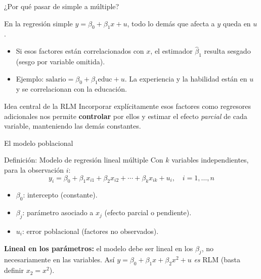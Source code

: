 \documentclass{beamer}
\begin{document}
\begin{frame}{¿Por qué pasar de simple a múltiple?}

En la regresión simple $y = \beta_0 + \beta_1 x + u$, todo lo demás que afecta a $y$ queda en $u$.

\begin{itemize}
    \item Si esos factores están correlacionados con $x$, el estimador $\hat{\beta}_1$ resulta \alert{sesgado} (sesgo por variable omitida).
    \item Ejemplo: $\text{salario} = \beta_0 + \beta_1 \text{educ} + u$. La experiencia y la habilidad están en $u$ y se correlacionan con la educación.
\end{itemize}

\pause

\begin{block}{Idea central de la RLM}
Incorporar explícitamente esos factores como regresores adicionales nos permite \textbf{controlar} por ellos y estimar el efecto \emph{parcial} de cada variable, manteniendo las demás constantes.
\end{block}

\end{frame}

\begin{frame}{El modelo poblacional}

\begin{block}{Definición: Modelo de regresión lineal múltiple}
Con $k$ variables independientes, para la observación $i$:
\[
y_i = \beta_0 + \beta_1 x_{i1} + \beta_2 x_{i2} + \cdots + \beta_k x_{ik} + u_i, \quad i=1,\dots,n
\]
\begin{itemize}
    \item $\beta_0$: intercepto (constante).
    \item $\beta_j$: parámetro asociado a $x_j$ (efecto parcial o pendiente).
    \item $u_i$: error poblacional (factores no observados).
\end{itemize}
\end{block}

\pause

\textbf{Lineal en los parámetros:} el modelo debe ser lineal en los $\beta_j$, no necesariamente en las variables. Así $y = \beta_0 + \beta_1 x + \beta_2 x^2 + u$ \emph{es} RLM (basta definir $x_2 = x^2$).

\end{frame}
\end{document}
